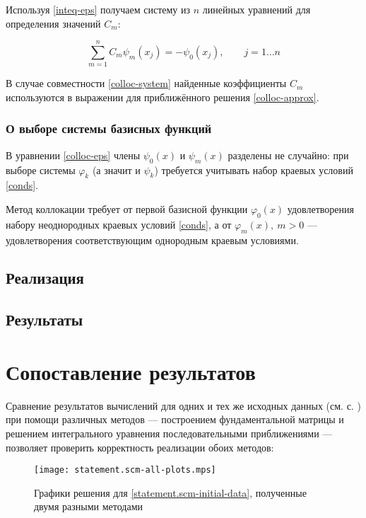 \documentclass{article}
\renewcommand{\phi}{\varphi}
\numberwithin{equation}{section}
\begin{document}
Используя \eqref{inteq-eps} получаем систему из $n$ линейных уравнений
для определения значений $C_m$:

\begin{equation}\label{colloc-system}
  \sum_{m=1}^n{C_m\psi_m(x_j)} = -\psi_0(x_j),\qquad j = 1 \dotso n
\end{equation}

В случае совместности \eqref{colloc-system} найденные коэффициенты
$C_m$ используются в выражении для приближённого решения
\eqref{colloc-approx}.

\subsubsection{О выборе системы базисных функций}
В уравнении \eqref{colloc-eps} члены $\psi_0(x)$ и $\psi_m(x)$
разделены не случайно: при выборе системы $\phi_k$ (а значит и
$\psi_k$) требуется учитывать набор краевых условий \eqref{conds}.

Метод коллокации требует от первой базисной функции $\phi_0(x)$
удовлетворения набору неоднородных краевых условий \eqref{conds}, а от
$\phi_m(x),\ m>0$ — удовлетворения соответствующим однородным краевым
условиями.

\subsection{Реализация}

\clearpage
\subsection{Результаты}

\clearpage
\section{Сопоставление результатов}

Сравнение результатов вычислений для одних и тех же исходных данных
(см. с. \pageref{statement.scm-initial-data}) при помощи различных
методов — построением фундаментальной матрицы и решением интегрального
уравнения последовательными приближениями — позволяет проверить
корректность реализации обоих методов:

\begin{figure}[hb]
  \centering
  \texttt{[image: statement.scm-all-plots.mps]}
  \caption{Графики решения для \eqref{statement.scm-initial-data},
    полученные двумя разными методами}
\end{figure}
\end{document}
